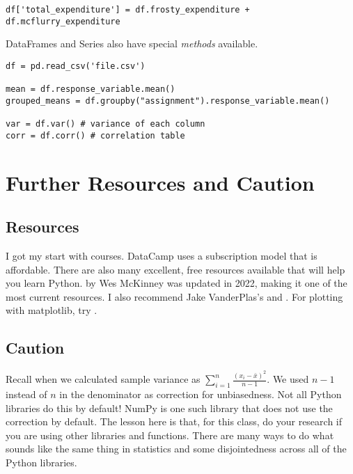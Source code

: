 \documentclass{article}
\begin{document}
\begin{lstlisting}
df['total_expenditure'] = df.frosty_expenditure + df.mcflurry_expenditure
\end{lstlisting}

\noindent DataFrames and Series also have special \emph{methods} available. 

\begin{lstlisting}
df = pd.read_csv('file.csv')

mean = df.response_variable.mean()
grouped_means = df.groupby("assignment").response_variable.mean()

var = df.var() # variance of each column
corr = df.corr() # correlation table
\end{lstlisting}

\section{Further Resources and Caution}

\subsection{Resources}

I got my start with  courses. DataCamp uses a subscription model that is affordable. There are also many excellent, free resources available that will help you learn Python.  by Wes McKinney was updated in 2022, making it one of the most current resources. I also recommend Jake VanderPlas's  and . For plotting with matplotlib, try . 

\subsection{Caution}

Recall when we calculated sample variance as $\sum_{i=1}^n \frac{(x_i - \bar{x})^2}{n-1}$. We used $n-1$ instead of $n$ in the denominator as correction for unbiasedness. Not all Python libraries do this by default! NumPy is one such library that does not use the correction by default. The lesson here is that, for this class, do your research if you are using other libraries and functions. There are many ways to do what sounds like the same thing in statistics and some disjointedness across all of the Python libraries. 
\end{document}
